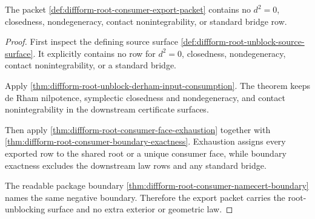\begin{theorem}
\label{thm:diffform-root-consumer-export-no-extra-laws}
The packet
\autoref{def:diffform-root-consumer-export-packet} contains no $d^2=0$,
closedness, nondegeneracy, contact nonintegrability, or standard bridge row.
\end{theorem}
\begin{proof}
First inspect the defining source surface
\autoref{def:diffform-root-unblock-source-surface}. It explicitly contains no
row for $d^2=0$, closedness, nondegeneracy, contact nonintegrability, or a
standard bridge.

Apply \autoref{thm:diffform-root-unblock-derham-input-consumption}. The
theorem keeps de Rham nilpotence, symplectic closedness and nondegeneracy, and
contact nonintegrability in the downstream certificate surfaces.

Then apply \autoref{thm:diffform-root-consumer-face-exhaustion} together with
\autoref{thm:diffform-root-consumer-boundary-exactness}. Exhaustion assigns
every exported row to the shared root or a unique consumer face, while
boundary exactness excludes the downstream law rows and any standard bridge.

The readable package boundary
\autoref{thm:diffform-root-consumer-namecert-boundary} names the same
negative boundary. Therefore the export packet carries the root-unblocking
surface and no extra exterior or geometric law.
\end{proof}
